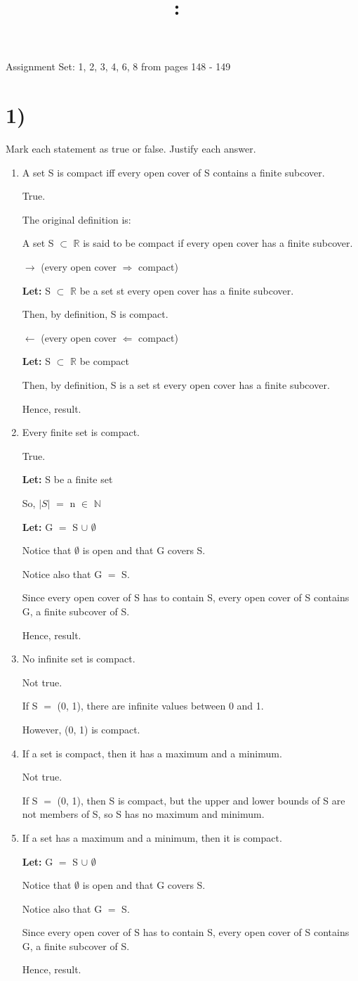 \documentclass{article}
\title{
    \vspace{2in}
    \textmd{\textbf{\hmwkClass:\ \hmwkTitle}}\\
    \normalsize\vspace{0.1in}\small\vspace{0.1in}\large{\textit{\hmwkClassInstructor}}
    \vspace{3in}
}
\author{\hmwkAuthorName}
\date{}
\newcommand{\mt}[1]{\ensuremath{#1}}
\newcommand\bsc[2][\DefaultOpt]{%
  \def\DefaultOpt{#2}%
  \section[#1]{#2}%
}
\newcommand{\balist}{\begin{enumerate}[label=\alph*.]}
\newcommand{\elist}{\end{enumerate}}
\newcommand{\lt}[1]{\textbf{Let: } #1}
\newcommand{\br}{\mt{\mathbb{R}} }       %
\newcommand{\bn}{\mt{\mathbb{N}} }       %
\newcommand{\mem}{\mt{\in} }
\newcommand{\es}{\mt{\emptyset} }        %
\newcommand{\sbs}{\mt{\subset} }         %
\newcommand{\lra}{ \mt{\longrightarrow} } %
\newcommand{\rar}{ \mt{\Rightarrow} }     %
\newcommand{\lla}{ \mt{\longleftarrow} }  %
\newcommand{\eql}{\mt{=} }
\begin{document}
Assignment Set: {1, 2, 3, 4, 6, 8} from pages 148 - 149

\bsc{1)}{
Mark each statement as true or false. Justify each answer.

\balist
\item A set S is compact iff every open cover of S contains a finite subcover.
	
	True.
	
	The original definition is:
	
	A set S \sbs \br is said to be compact if every open cover has a finite subcover.
	
	\lra (every open cover \rar compact)

	\lt{S \sbs \br be a set st every open cover has a finite subcover.}
	
	Then, by definition, S is compact.
	
	\lla (every open cover \mt{\Leftarrow} compact)
	
	\lt{S \sbs \br be compact}
	
	Then, by definition, S is a set st every open cover has a finite subcover.
	
	Hence, result.

	
\item Every finite set is compact.

	True.
	
	\lt{S be a finite set}
	
	So, $|S|$ \eql n \mem \bn
	
	\lt{G \eql S $\cup$ \es}
	
	Notice that \es is open and that G covers S.
	
	Notice also that G \eql S.
	
	Since every open cover of S has to contain S, every open cover of S contains G, a finite subcover of S.
	
	Hence, result.
\item No infinite set is compact.
	
	Not true.
	
	If S \eql (0, 1), there are infinite values between 0 and 1.
	
	However, (0, 1) is compact.
\item If a set is compact, then it has a maximum and a minimum.
	
	Not true.
	
	If S \eql (0, 1), then S is compact, but the upper and lower bounds of S are not members of S, so S has no maximum and minimum.
\item If a set has a maximum and a minimum, then it is compact.
	
	\lt{G \eql S $\cup$ \es}
	
	Notice that \es is open and that G covers S.
	
	Notice also that G \eql S.
	
	Since every open cover of S has to contain S, every open cover of S contains G, a finite subcover of S.
	
	Hence, result.
\elist

}
\end{document}
